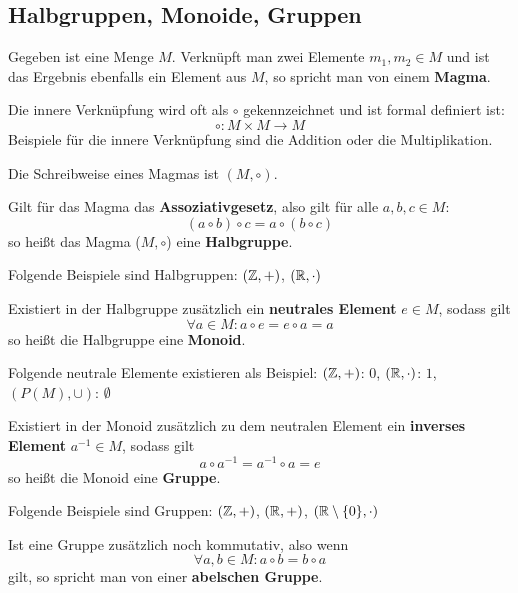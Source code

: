 \documentclass[11pt]{article}
\begin{document}
\subsection{Halbgruppen, Monoide, Gruppen}
\begin{definition}
  Gegeben ist eine Menge $M$. Verknüpft man zwei Elemente $m_1, m_2 \in M$ und ist das Ergebnis ebenfalls ein Element aus
  $M$, so spricht man von einem \textbf{Magma}.

  Die innere Verknüpfung wird oft als $\circ$ gekennzeichnet und ist formal definiert ist:
  \[
    \circ : M \times M \longrightarrow M
  \]
  Beispiele für die innere Verknüpfung sind die Addition oder die Multiplikation.

  Die Schreibweise eines Magmas ist $(M, \circ)$.
\end{definition}
\begin{definition}
  Gilt für das Magma das \textbf{Assoziativgesetz}, also gilt für alle $a, b, c \in M$:
  \[
    (a \circ b) \circ c = a \circ (b \circ c)
  \]
  so heißt das Magma ($M, \circ$) eine \textbf{Halbgruppe}.
  \begin{bsp}
    Folgende Beispiele sind Halbgruppen:
    $(\mathbb{Z}, +)$,
    $(\mathbb{R}, \cdot)$
  \end{bsp}
\end{definition}

Existiert in der Halbgruppe zusätzlich ein \textbf{neutrales Element} $e \in M$, sodass gilt
\[
  \forall a \in M: a \circ e = e \circ a = a
\]
so heißt die Halbgruppe eine \textbf{Monoid}.
\begin{bsp}
  Folgende neutrale Elemente existieren als Beispiel:
  $(\mathbb{Z}, +)$: $0$,
  $(\mathbb{R}, \cdot)$: $1$,
  $(P(M), \cup)$: $\emptyset$
\end{bsp}

Existiert in der Monoid zusätzlich zu dem neutralen Element ein \textbf{inverses Element} $a^{-1} \in M$, sodass gilt
\[
  a \circ a^{-1} = a^{-1} \circ a = e
\]
so heißt die Monoid eine \textbf{Gruppe}.

\begin{bsp}
  Folgende Beispiele sind Gruppen:
  $(\mathbb{Z}, +)$,
  $(\mathbb{R}, +)$,
  $(\mathbb{R}\setminus\{0\}, \cdot)$
\end{bsp}

\begin{anmk}
  Ist eine Gruppe zusätzlich noch kommutativ, also wenn
  \[
    \forall a, b \in M: a \circ b = b \circ a
  \]
  gilt, so spricht man von einer \textbf{abelschen Gruppe}.
\end{anmk}
\end{document}
